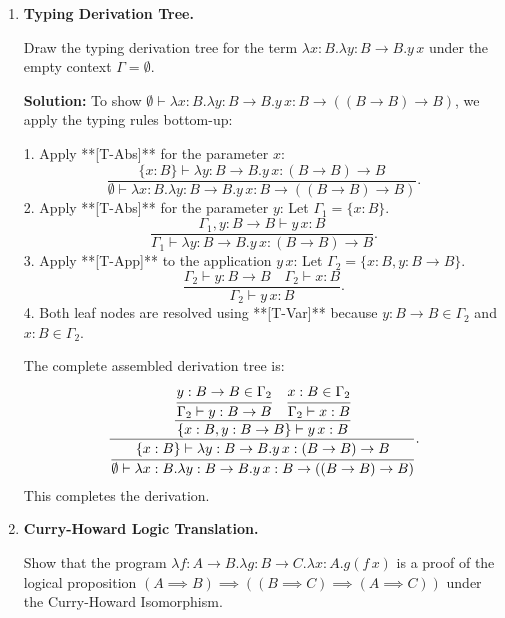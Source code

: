 \documentclass[12pt, a4paper]{book}
\begin{document}
\begin{problembox}
\begin{enumerate}[label=\textbf{E\arabic*.}]
  \item \textbf{Typing Derivation Tree.}
  
        Draw the typing derivation tree for the term $\lambda x : B. \lambda y : B \to B. y \, x$ under the empty context $\Gamma = \emptyset$.
        
        \textbf{Solution:}
        To show $\emptyset \vdash \lambda x : B. \lambda y : B \to B. y \, x : B \to ((B \to B) \to B)$, we apply the typing rules bottom-up:
        
        1. Apply **[T-Abs]** for the parameter $x$:
           \[
             \frac{\{x : B\} \vdash \lambda y : B \to B. y \, x : (B \to B) \to B}{\emptyset \vdash \lambda x : B. \lambda y : B \to B. y \, x : B \to ((B \to B) \to B)}.
           \]
        2. Apply **[T-Abs]** for the parameter $y$:
           Let $\Gamma_1 = \{x : B\}$.
           \[
             \frac{\Gamma_1, y : B \to B \vdash y \, x : B}{\Gamma_1 \vdash \lambda y : B \to B. y \, x : (B \to B) \to B}.
           \]
        3. Apply **[T-App]** to the application $y \, x$:
           Let $\Gamma_2 = \{x : B, y : B \to B\}$.
           \[
             \frac{\Gamma_2 \vdash y : B \to B \quad \Gamma_2 \vdash x : B}{\Gamma_2 \vdash y \, x : B}.
           \]
        4. Both leaf nodes are resolved using **[T-Var]** because $y:B\to B \in \Gamma_2$ and $x:B \in \Gamma_2$.
        
        The complete assembled derivation tree is:
        \[
          \frac{\cfrac{\cfrac{y : B \to B \in \Gamma_2}{\Gamma_2 \vdash y : B \to B} \quad \cfrac{x : B \in \Gamma_2}{\Gamma_2 \vdash x : B}}{\{x : B, y : B \to B\} \vdash y \, x : B}}{\cfrac{\{x : B\} \vdash \lambda y : B \to B. y \, x : (B \to B) \to B}{\emptyset \vdash \lambda x : B. \lambda y : B \to B. y \, x : B \to ((B \to B) \to B)}}.
        \]
        This completes the derivation.
        
  \item \textbf{Curry-Howard Logic Translation.}
  
        Show that the program $\lambda f : A \to B. \lambda g : B \to C. \lambda x : A. g (f \, x)$ is a proof of the logical proposition $(A \implies B) \implies ((B \implies C) \implies (A \implies C))$ under the Curry-Howard Isomorphism.
        

\end{enumerate}
\end{problembox}
\end{document}
